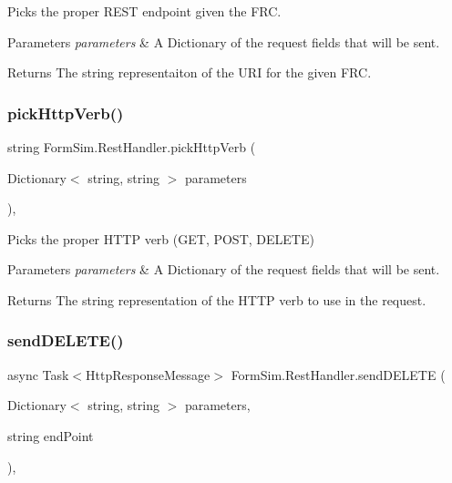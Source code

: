 Picks the proper R\+E\+ST endpoint given the F\+RC. 


\begin{DoxyParams}{Parameters}
{\em parameters} & A Dictionary of the request fields that will be sent.\\
\hline
\end{DoxyParams}
\begin{DoxyReturn}{Returns}
The string representaiton of the U\+RI for the given F\+RC.
\end{DoxyReturn}
\mbox{\label{class_form_sim_1_1_rest_handler_a205454167e8716d9c1ed0e05d6e88564}} 
\subsubsection{\texorpdfstring{pick\+Http\+Verb()}{pickHttpVerb()}}
{\footnotesize\ttfamily string Form\+Sim.\+Rest\+Handler.\+pick\+Http\+Verb (\begin{DoxyParamCaption}\item[{Dictionary$<$ string, string $>$}]{parameters }\end{DoxyParamCaption})\hspace{0.3cm}{\ttfamily [inline]}, {\ttfamily [private]}}



Picks the proper H\+T\+TP verb (G\+ET, P\+O\+ST, D\+E\+L\+E\+TE) 


\begin{DoxyParams}{Parameters}
{\em parameters} & A Dictionary of the request fields that will be sent.\\
\hline
\end{DoxyParams}
\begin{DoxyReturn}{Returns}
The string representation of the H\+T\+TP verb to use in the request.
\end{DoxyReturn}
\mbox{\label{class_form_sim_1_1_rest_handler_a6c259e23bd88dc7191327fcca06232d0}} 
\subsubsection{\texorpdfstring{send\+D\+E\+L\+E\+T\+E()}{sendDELETE()}}
{\footnotesize\ttfamily async Task$<$Http\+Response\+Message$>$ Form\+Sim.\+Rest\+Handler.\+send\+D\+E\+L\+E\+TE (\begin{DoxyParamCaption}\item[{Dictionary$<$ string, string $>$}]{parameters,  }\item[{string}]{end\+Point }\end{DoxyParamCaption})\hspace{0.3cm}{\ttfamily [inline]}, {\ttfamily [private]}}



